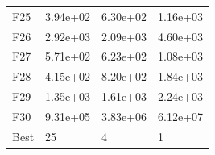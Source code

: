 \begin{table}[H]
\begin{minipage}{.5\linewidth}
\begin{tabular}{llll}
          F25  &  3.94e+02 &  6.30e+02 &  1.16e+03 \\
          F26  &  2.92e+03 &  2.09e+03 &  4.60e+03 \\
          F27  &  5.71e+02 &  6.23e+02 &  1.08e+03 \\
          F28  &  4.15e+02 &  8.20e+02 &  1.84e+03 \\
          F29  &  1.35e+03 &  1.61e+03 &  2.24e+03 \\
          F30  &  9.31e+05 &  3.83e+06 &  6.12e+07 \\
          Best &        25 &         4 &         1 \\
          \bottomrule
          \end{tabular}
          
    \end{minipage} 
\end{table}

